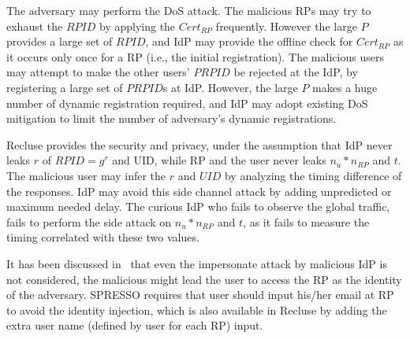  The adversary may perform the DoS attack. The malicious RPs may try to exhaust the $RPID$  by applying the $Cert_{RP}$ frequently. However the large $P$ provides a large set of $RPID$, and IdP may provide the offline check for $Cert_{RP}$ as it occurs only once for a RP (i.e., the initial registration). The malicious users may attempt to make the other users' $PRPID$ be rejected at the IdP, by registering a large set of $PRPID$s at IdP. However, the large $P$ makes a huge number of dynamic registration required, and IdP may adopt existing DoS mitigation  to limit the number of adversary's dynamic registrations. 

 Recluse provides the security and privacy, under the assumption that IdP never leaks $r$ of $RPID=g^r$ and UID, while RP and the user never leaks $n_u*n_{RP}$ and $t$. The malicious user may infer the $r$ and $UID$ by analyzing the timing difference of the responses. IdP may avoid this side channel attack by adding unpredicted or maximum needed delay. The curious IdP who fails to observe the global traffic, fails to perform the side attack on $n_u*n_{RP}$ and $t$, as it fails to measure the timing correlated with these two values.

 It has been discussed in~\cite{SPRESSO} that even the impersonate attack by malicious IdP is not considered, the malicious might lead the user to access the RP as the identity of the adversary. SPRESSO requires that user should input his/her email at RP to avoid the identity injection, which is also available in Recluse by adding the extra user name (defined by user for each RP) input. 
